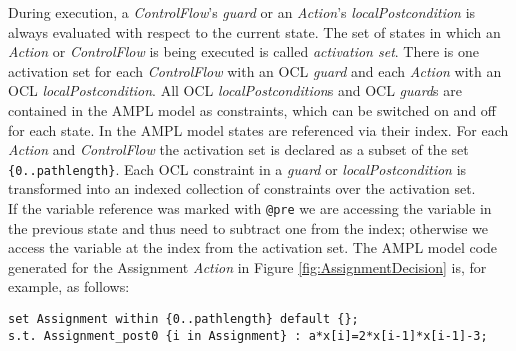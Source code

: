 \documentclass[runningheads,a4paper]{llncs}%
\newcommand{\UMLType}[1]{\textsf{\textit{#1}}} %
\newcommand{\UMLReference}[1]{\textsf{\textit{#1}}} %
\newcommand{\AMPLCode}[1]{\texttt{#1}}
\begin{document}
During execution, a \UMLType{ControlFlow}'s \UMLReference{guard} or an \UMLType{Action}'s \UMLReference{localPostcondition} is always evaluated with respect to the current state. The set of states in which an \UMLType{Action} or \UMLType{ControlFlow} is being executed is called \emph{activation set}. There is one activation set for each \UMLType{ControlFlow} with an OCL \UMLReference{guard} and each \UMLType{Action} with an OCL \UMLReference{localPostcondition}. All OCL \UMLReference{localPostcondition}s and OCL \UMLReference{guard}s are contained in the AMPL model as constraints, which can be switched on and off for each state. In the AMPL model states are referenced via their index. For each \UMLType{Action} and \UMLType{ControlFlow} the activation set is declared as a subset of the set \AMPLCode{\{0..pathlength\}}. Each OCL constraint in a \UMLReference{guard} or \UMLReference{localPostcondition} is transformed into an indexed collection of constraints over the activation set.\\
If the variable reference was marked with \verb=@pre= we are accessing the variable in the previous state and thus need to subtract one from the index; otherwise we access the variable at the index from the activation set. The AMPL model code generated for the Assignment \UMLType{Action} in Figure \ref{fig:AssignmentDecision} is, for example, as follows:%
\begin{lstlisting}[basicstyle=\ttfamily,language=ampl,breaklines=true]
set Assignment within {0..pathlength} default {};
s.t. Assignment_post0 {i in Assignment} : a*x[i]=2*x[i-1]*x[i-1]-3;
\end{lstlisting}
\end{document}
